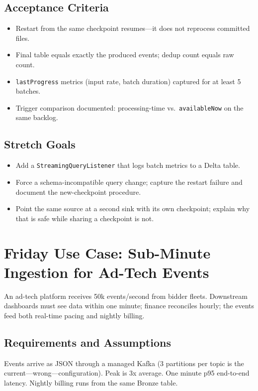 \subsection*{Acceptance Criteria}
\begin{itemize}
    \item Restart from the same checkpoint resumes---it does not reprocess committed files.
    \item Final table equals exactly the produced events; dedup count equals raw count.
    \item \texttt{lastProgress} metrics (input rate, batch duration) captured for at least 5 batches.
    \item Trigger comparison documented: processing-time vs.\ \texttt{availableNow} on the same backlog.
\end{itemize}

\subsection*{Stretch Goals}
\begin{itemize}
    \item Add a \texttt{StreamingQueryListener} that logs batch metrics to a Delta table.
    \item Force a schema-incompatible query change; capture the restart failure and document the new-checkpoint procedure.
    \item Point the same source at a second sink with its own checkpoint; explain why that is safe while sharing a checkpoint is not.
\end{itemize}

\section{Friday Use Case: Sub-Minute Ingestion for Ad-Tech Events}
An ad-tech platform receives 50k events/second from bidder fleets. Downstream dashboards must see data within one minute; finance reconciles hourly; the events feed both real-time pacing and nightly billing.

\subsection{Requirements and Assumptions}
Events arrive as JSON through a managed Kafka (3 partitions per topic is the current---wrong---configuration). Peak is 3x average. One minute p95 end-to-end latency. Nightly billing runs from the same Bronze table.

